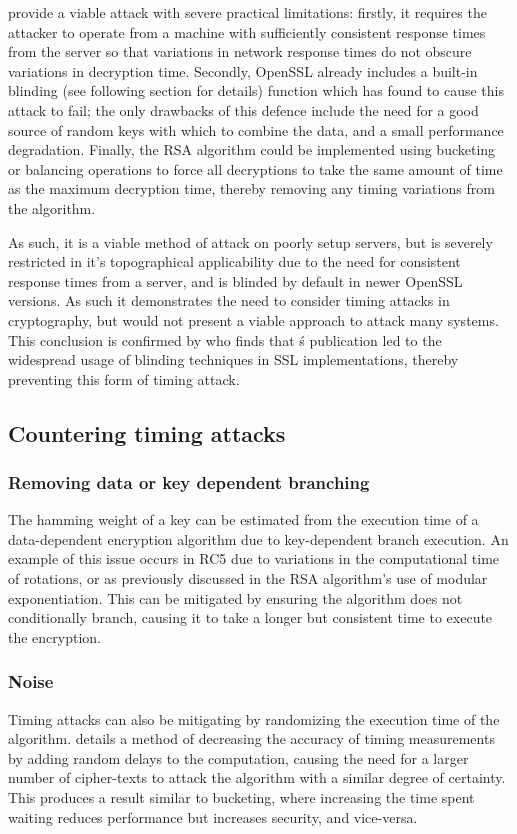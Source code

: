 \documentclass[british,10pt,a4paper]{article}
\begin{document}
\citeauthor{Brumley2005-ez} provide a viable attack with severe practical limitations: firstly, it requires the attacker to operate from a machine with sufficiently consistent response times from the server so that variations in network response times do not obscure variations in decryption time. Secondly, OpenSSL already includes a built-in blinding (see following section for details) function which \citeauthor{Brumley2005-ez} has found to cause this attack to fail; the only drawbacks of this defence include the need for a good source of random keys with which to combine the data, and a small performance degradation. Finally, the RSA algorithm could be implemented using bucketing or balancing operations to force all decryptions to take the same amount of time as the maximum decryption time, thereby removing any timing variations from the algorithm.

As such, it is a viable method of attack on poorly setup servers, but is severely restricted in it's topographical applicability due to the need for consistent response times from a server, and is blinded by default in newer OpenSSL versions. As such it demonstrates the need to consider timing attacks in cryptography, but would not present a viable approach to attack many systems. This conclusion is confirmed by \citet{wong} who finds that \citeauthor{Brumley2005-ez}\'s publication led to the widespread usage of blinding techniques in SSL implementations, thereby preventing this form of timing attack.


\subsection{Countering timing attacks}

\subsubsection{Removing data or key dependent branching}
The hamming weight of a key can be estimated from the execution time of a data-dependent encryption algorithm due to key-dependent branch execution. An example of this issue occurs in RC5 \cite{Handschuh1999} due to variations in the computational time of rotations, or as previously discussed in the RSA algorithm's use of modular exponentiation.
This can be mitigated by ensuring the algorithm does not conditionally branch, causing it to take a longer but consistent time to execute the encryption.

\subsubsection{Noise}
Timing attacks can also be mitigating by randomizing the execution time of the algorithm. \citet{kocher96timing} details a method of decreasing the accuracy of timing measurements by adding random delays to the computation, causing the need for a larger number of cipher-texts to attack the algorithm with a similar degree of certainty. This produces a result similar to bucketing, where increasing the time spent waiting reduces performance but increases security, and vice-versa.
\end{document}
